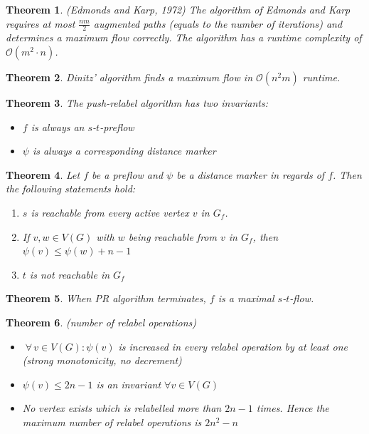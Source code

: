 \documentclass{article}
\newtheorem{theorem}{Theorem}
\newcommand{\flow}[2]{$#1$-$#2$-flow}
\newcommand{\fall}{\;\forall\,}
\begin{document}
\begin{theorem}\label{satz-4.6}
  (Edmonds and Karp, 1972)
  The algorithm of Edmonds and Karp requires at most $\frac{nm}2$ augmented paths (equals to the number of iterations) and determines a maximum flow correctly. The algorithm has a runtime complexity of $\mathcal{O}(m^2 \cdot n)$.
\end{theorem}
\begin{theorem}\label{satz-4.7}
  Dinitz' algorithm finds a maximum flow in $\mathcal{O}(n^2m)$ runtime.
\end{theorem}
\begin{theorem}\label{proposition-4.8}
  The push-relabel algorithm has two invariants:
  \begin{itemize}
    \item $f$ is always an $s$-$t$-preflow
    \item $\psi$ is always a corresponding distance marker
  \end{itemize}
\end{theorem}
\begin{theorem}\label{lemma-4.9}
  Let $f$ be a preflow and $\psi$ be a distance marker in regards of $f$. Then the following statements hold:
  \begin{enumerate}
    \item $s$ is reachable from every active vertex $v$ in $G_f$.
    \item If $v, w \in V(G)$ with $w$ being reachable from $v$ in $G_f$,
          then $\psi(v) \leq \psi(w) + n - 1$
    \item $t$ is not reachable in $G_f$
  \end{enumerate}
\end{theorem}
\begin{theorem}\label{satz-4.10}
  When PR algorithm terminates, $f$ is a maximal \flow st.
\end{theorem}
\begin{theorem}\label{lemma-4.11}
  (number of relabel operations)
  \begin{itemize}
    \item $\fall v \in V(G): \psi(v)$ is increased in every relabel operation by at least one (strong monotonicity, no decrement)
    \item $\psi(v) \leq 2n - 1$ is an invariant $\forall v \in V(G)$
    \item No vertex exists which is relabelled more than $2n - 1$ times. Hence the maximum number of relabel operations is $2n^2 - n$
  \end{itemize}
\end{theorem}
\end{document}
